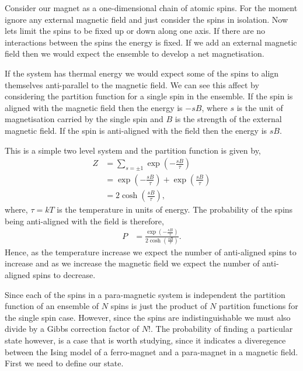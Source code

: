 \documentclass[a4paper]{article}
\begin{document}
\begin{multicols}{2}
        Consider our magnet as a one-dimensional chain of atomic spins. %
        For the moment ignore any external magnetic field and just %
        consider the spins in isolation. Now lets limit the spins to %
        be fixed up or down along one axis. If there are no interactions %
        between the spins the energy is fixed. If we add an external %
        magnetic field then we would expect the ensemble to develop a %
        net magnetisation.


        If the system has thermal energy we would expect some of the %
        spins to align themselves anti-parallel to the magnetic field. %
        We can see this affect by considering the partition function %
        for a single spin in the ensemble. If the spin is aligned with %
        the magnetic field then the energy is \(-sB\), where \(s\) is %
        the unit of magnetisation carried by the single spin and \(B\) %
        is the strength of the external magnetic field. If the spin is %
        anti-aligned with the field then the energy is \(sB\). 


        This is a simple two level system and the partition function %
        is given by, 
        \begin{align}
            Z &= \sum_{s = \pm 1}\exp\left(-\frac{sB}{\tau}\right)\nonumber\\
                &= \exp\left(-\frac{sB}{\tau}\right) + 
                    \exp\left(\frac{sB}{\tau}\right)\nonumber\\
                &= 2\cosh\left(\frac{sB}{\tau}\right),
            \label{eqn:1}
        \end{align}
        where, \(\tau = kT\) is the temperature in units of energy. %
        The probability of the spins being anti-aligned with the %
        field is therefore, 
        \begin{align}
            P &= \frac{\exp\left(-\frac{sB}{\tau}\right)}
                    {2\cosh\left(\frac{sB}{\tau}\right)}.
            \label{eqn:2}
        \end{align}
        Hence, as the temperature increase we expect the number of %
        anti-aligned spins to increase and as we increase the %
        magnetic field we expect the number of anti-aligned spins %
        to decrease. 


        Since each of the spins in a para-magnetic system is independent %
        the partition function of an ensemble of \(N\) spins is just %
        the product of \(N\) partition functions for the single spin %
        case. However, since the spins are indistinguishable we must %
        also divide by a Gibbs correction factor of \(N!\). %
        The probability of finding a particular state however, %
        is a case that is worth studying, since it indicates a %
        diveregence between the Ising model of a ferro-magnet and %
        a para-magnet in a magnetic field. First we need to define %
        our state. 



\end{multicols}
\end{document}
